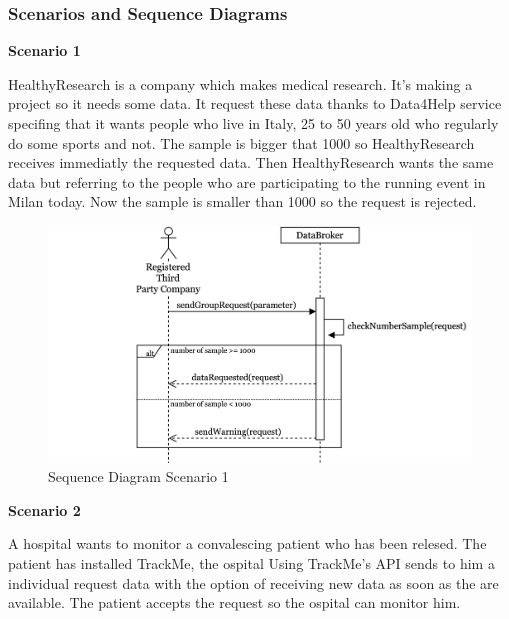 \documentclass[../main.tex]{subfiles}
\begin{document}
	\subsubsection{Scenarios and Sequence Diagrams}
		\begin{minipage}{\textwidth}
			{\bf Scenario 1}
			\vspace{3mm}

			HealthyResearch is a company which makes medical research. It's making a project so it needs some data. It request these data thanks to Data4Help service specifing that it wants people who live in Italy, 25 to 50 years old who regularly do some sports and not. The sample is bigger that 1000 so HealthyResearch receives immediatly the requested data.
			Then HealthyResearch wants the same data but referring to the people who are participating to the running event in Milan today. Now the sample is smaller than 1000 so the request is rejected.

			\vspace{5mm}
		\end{minipage}
		\begin{figure}[H]
			\centering
			\includegraphics[scale=.3]{images/sequenceDiagram1.png}
			\caption{Sequence Diagram Scenario 1 \label{fig:Sequence Diagram Scenario 1}}
		\end{figure}
		\begin{minipage}{\textwidth}
			{\bf Scenario 2}
			\vspace{3mm}

			A hospital wants to monitor a convalescing patient who has been relesed. The patient has installed TrackMe, the ospital Using TrackMe's API sends to him a individual request data with the option of receiving new data as soon as the are available. The patient accepts the request so the ospital can monitor him.
			\vspace{5mm}
		\end{minipage}
\end{document}
